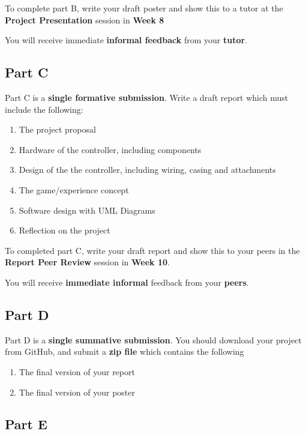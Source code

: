 \documentclass{../../fal_assignment}
\begin{document}
To complete part B, write your draft poster and show this to a tutor at the \textbf{Project Presentation} session in \textbf{Week 8}

You will receive immediate \textbf{informal feedback} from your \textbf{tutor}.

\subsection*{Part C}

Part C is a \textbf{single formative submission}. Write a draft report which must include the following:

\begin{enumerate}[label=\roman*.]
	\item The project proposal
	\item Hardware of the controller, including components
	\item Design of the the controller, including wiring, casing and attachments
	\item The game/experience concept
	\item Software design with UML Diagrams
	\item Reflection on the project
\end{enumerate}

To completed part C, write your draft report and show this to your peers in the \textbf{Report Peer Review} session in \textbf{Week 10}. 

You will receive \textbf{immediate informal} feedback from your \textbf{peers}.

\subsection*{Part D}

Part D is a \textbf{single summative submission}. You should download your project from GitHub, and submit a \textbf{zip file} which contains the following

	\begin{enumerate}
	\item The final version of your report
	\item The final version of your poster
	\end{enumerate}

\subsection*{Part E}
\end{document}
